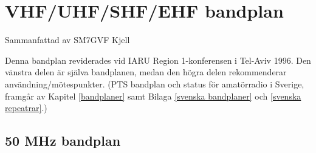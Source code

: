 \section{VHF/UHF/SHF/EHF bandplan}

Sammanfattad av SM7GVF Kjell

Denna bandplan reviderades vid IARU Region 1-konferensen i Tel-Aviv 1996.
Den vänstra delen är själva bandplanen, medan den högra delen rekommenderar användning/mötespunkter.
(PTS bandplan och status för amatörradio i Sverige, framgår av Kapitel \ref{bandplaner} samt Bilaga \ref{svenska bandplaner} och \ref{svenska repeatrar}.)

\subsection{50 MHz bandplan}

